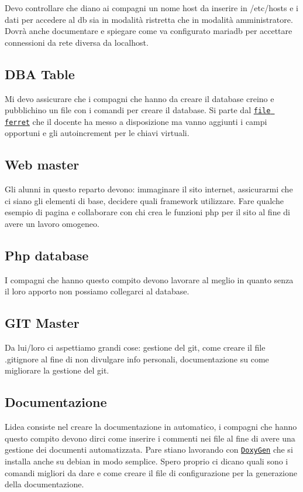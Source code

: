 Devo controllare che diano ai compagni un nome host da inserire in /etc/hosts e i dati per accedere al db sia in modalità ristretta che in modalità amministratore. Dovrà anche documentare e spiegare come va configurato mariadb per accettare connessioni da rete diversa da localhost.

\subsection*{D\+BA Table}

Mi devo assicurare che i compagni che hanno da creare il database creino e pubblichino un file con i comandi per creare il database. Si parte dal \href{./manuali/documenti.ger}{\tt file ferret} che il docente ha messo a disposizione ma vanno aggiunti i campi opportuni e gli autoincrement per le chiavi virtuali.

\subsection*{Web master}

Gli alunni in questo reparto devono\+: immaginare il sito internet, assicurarmi che ci siano gli elementi di base, decidere quali framework utilizzare. Fare qualche esempio di pagina e collaborare con chi crea le funzioni php per il sito al fine di avere un lavoro omogeneo.

\subsection*{Php database}

I compagni che hanno questo compito devono lavorare al meglio in quanto senza il loro apporto non possiamo collegarci al database.

\subsection*{G\+IT Master}

Da lui/loro ci aspettiamo grandi cose\+: gestione del git, come creare il file .gitignore al fine di non divulgare info personali, documentazione su come migliorare la gestione del git.

\subsection*{Documentazione}

L\textquotesingle{}idea consiste nel creare la documentazione in automatico, i compagni che hanno questo compito devono dirci come inserire i commenti nei file al fine di avere una gestione dei documenti automatizzata. Pare stiano lavorando con \href{http://doxygen.nl/}{\tt Doxy\+Gen} che si installa anche su debian in modo semplice. Spero proprio ci dicano quali sono i comandi migliori da dare e come creare il file di configurazione per la generazione della documentazione.

